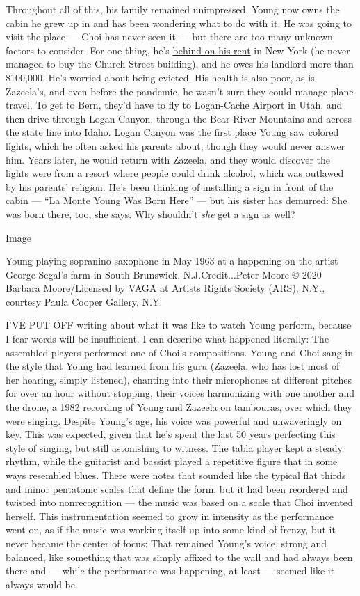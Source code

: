 Throughout all of this, his family remained unimpressed. Young now owns
the cabin he grew up in and has been wondering what to do with it. He
was going to visit the place --- Choi has never seen it --- but there
are too many unknown factors to consider. For one thing, he's
\href{https://charity.gofundme.com/o/en/campaign/save-the-dream-house-keep-our-dream-alive}{behind
on his rent} in New York (he never managed to buy the Church Street
building), and he owes his landlord more than \$100,000. He's worried
about being evicted. His health is also poor, as is Zazeela's, and even
before the pandemic, he wasn't sure they could manage plane travel. To
get to Bern, they'd have to fly to Logan-Cache Airport in Utah, and then
drive through Logan Canyon, through the Bear River Mountains and across
the state line into Idaho. Logan Canyon was the first place Young saw
colored lights, which he often asked his parents about, though they
would never answer him. Years later, he would return with Zazeela, and
they would discover the lights were from a resort where people could
drink alcohol, which was outlawed by his parents' religion. He's been
thinking of installing a sign in front of the cabin --- ``La Monte Young
Was Born Here'' --- but his sister has demurred: She was born there,
too, she says. Why shouldn't \emph{she} get a sign as well?

Image

Young playing sopranino saxophone in May 1963 at a happening on the
artist George Segal's farm in South Brunswick, N.J.Credit...Peter Moore
© 2020 Barbara Moore/Licensed by VAGA at Artists Rights Society (ARS),
N.Y., courtesy Paula Cooper Gallery, N.Y.

I'VE PUT OFF writing about what it was like to watch Young perform,
because I fear words will be insufficient. I can describe what happened
literally: The assembled players performed one of Choi's compositions.
Young and Choi sang in the style that Young had learned from his guru
(Zazeela, who has lost most of her hearing, simply listened), chanting
into their microphones at different pitches for over an hour without
stopping, their voices harmonizing with one another and the drone, a
1982 recording of Young and Zazeela on tambouras, over which they were
singing. Despite Young's age, his voice was powerful and unwaveringly on
key. This was expected, given that he's spent the last 50 years
perfecting this style of singing, but still astonishing to witness. The
tabla player kept a steady rhythm, while the guitarist and bassist
played a repetitive figure that in some ways resembled blues. There were
notes that sounded like the typical flat thirds and minor pentatonic
scales that define the form, but it had been reordered and twisted into
nonrecognition --- the music was based on a scale that Choi invented
herself. This instrumentation seemed to grow in intensity as the
performance went on, as if the music was working itself up into some
kind of frenzy, but it never became the center of focus: That remained
Young's voice, strong and balanced, like something that was simply
affixed to the wall and had always been there and --- while the
performance was happening, at least --- seemed like it always would be.

